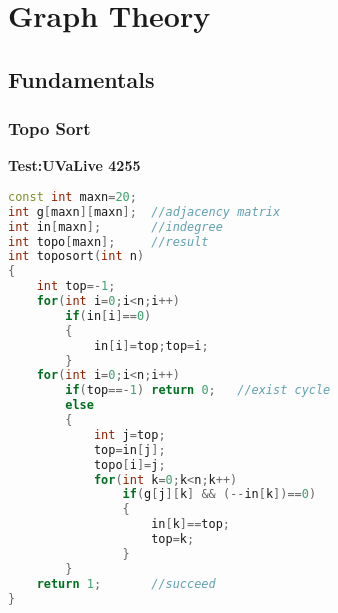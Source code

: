 \chapter{Graph Theory}
 \section{Fundamentals} 
  \subsection{Topo Sort}
  \textbf{Test:UVaLive 4255}
  \begin{lstlisting}[language=C++]
const int maxn=20;
int g[maxn][maxn];  //adjacency matrix
int in[maxn];       //indegree
int topo[maxn];     //result
int toposort(int n)
{
    int top=-1;
    for(int i=0;i<n;i++)
        if(in[i]==0)
        {
            in[i]=top;top=i;
        }
    for(int i=0;i<n;i++)
        if(top==-1) return 0;   //exist cycle
        else
        {
            int j=top;
            top=in[j];
            topo[i]=j;
            for(int k=0;k<n;k++)
                if(g[j][k] && (--in[k])==0)
                {
                    in[k]==top;
                    top=k;
                }
        }
    return 1;       //succeed
}
  \end{lstlisting}

